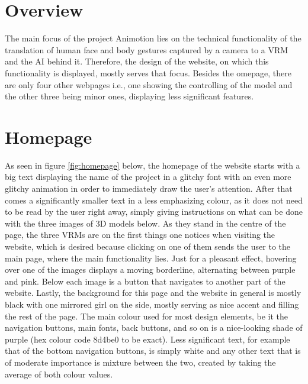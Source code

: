 \section{Overview}
The main focus of the project Animotion lies on the technical functionality 
of the translation of human face and body gestures captured by a camera to 
a VRM and the AI behind it. Therefore, the design of the website, on which
this functionality is displayed, mostly serves that focus. Besides the 
omepage, there are only four other webpages i.e., one showing the controlling 
of the model and the other three being minor ones, displaying less significant 
features.

\section{Homepage}
As seen in figure \ref{fig:homepage} below, the homepage of the website starts with a big text
displaying the name of the project in a glitchy font with an even more glitchy
animation in order to immediately draw the user's attention. After that comes a
significantly smaller text in a less emphasizing colour, as it does not need to
be read by the user right away, simply giving instructions on what can be done
with the three images of 3D models below. As they stand in the centre of the page,
the three VRMs are on the first things one notices when visiting the website, which
is desired because clicking on one of them sends the user to the main page, where
the main functionality lies. Just for a pleasant effect, hovering over one of the
images displays a moving borderline, alternating between purple and pink. Below
each image is a button that navigates to another part of the website. Lastly, the
background for this page and the website in general is mostly black with one mirrored
girl on the side, mostly serving as nice accent and filling the rest of the page.
The main colour used for most design elements, be it the navigation buttons, main
fonts, back buttons, and so on is a nice-looking shade of purple (hex colour code 8d4be0 to be exact). 
Less significant text, for example that of the bottom navigation
buttons, is simply white and any other text that is of moderate importance is mixture
between the two, created by taking the average of both colour values.

